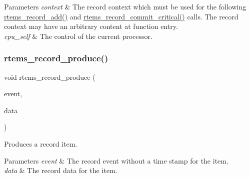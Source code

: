 \begin{DoxyParams}{Parameters}
{\em context} & The record context which must be used for the following \mbox{\hyperlink{group__RTEMSRecord_ga5e164fc0a361be6cac976c3afa8ec732}{rtems\+\_\+record\+\_\+add()}} and \mbox{\hyperlink{group__RTEMSRecord_ga2a34e1207be9164960fd9fe9bf18bb57}{rtems\+\_\+record\+\_\+commit\+\_\+critical()}} calls. The record context may have an arbitrary content at function entry. \\
\hline
{\em cpu\+\_\+self} & The control of the current processor. \\
\hline
\end{DoxyParams}
\mbox{\label{group__RTEMSRecord_ga136d81367324d6729819192181ea68bb}} 
\subsubsection{\texorpdfstring{rtems\_record\_produce()}{rtems\_record\_produce()}}
{\footnotesize\ttfamily void rtems\+\_\+record\+\_\+produce (\begin{DoxyParamCaption}\item[{\mbox{\hyperlink{group__RTEMSRecord_gac748f47c13acd7d0595694ed7f19074b}{rtems\+\_\+record\+\_\+event}}}]{event,  }\item[{\mbox{\hyperlink{group__RTEMSRecord_gab483bd3ec735835dac6788b78c817eab}{rtems\+\_\+record\+\_\+data}}}]{data }\end{DoxyParamCaption})}



Produces a record item. 


\begin{DoxyParams}{Parameters}
{\em event} & The record event without a time stamp for the item. \\
\hline
{\em data} & The record data for the item. \\
\hline
\end{DoxyParams}
\mbox{\label{group__RTEMSRecord_gaa5332b5d70ad8e147ebe44ca25341944}} 
